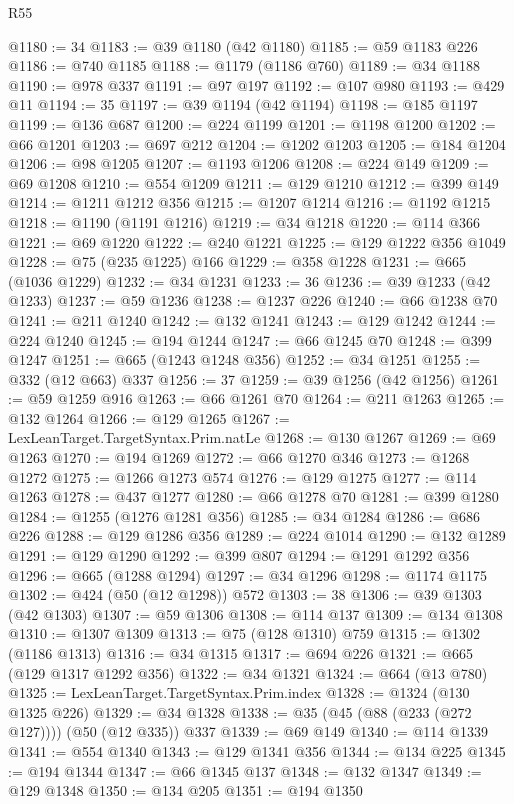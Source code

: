 \begin{lexlean}{R55}
\begin{coremodule}
@1180 := 34
@1183 := @39 @1180 (@42 @1180)
@1185 := @59 @1183 @226
@1186 := @740 @1185
@1188 := @1179 (@1186 @760)
@1189 := @34 @1188
@1190 := @978 @337
@1191 := @97 @197
@1192 := @107 @980
@1193 := @429 @11
@1194 := 35
@1197 := @39 @1194 (@42 @1194)
@1198 := @185 @1197
@1199 := @136 @687
@1200 := @224 @1199
@1201 := @1198 @1200
@1202 := @66 @1201
@1203 := @697 @212
@1204 := @1202 @1203
@1205 := @184 @1204
@1206 := @98 @1205
@1207 := @1193 @1206
@1208 := @224 @149
@1209 := @69 @1208
@1210 := @554 @1209
@1211 := @129 @1210
@1212 := @399 @149
@1214 := @1211 @1212 @356
@1215 := @1207 @1214
@1216 := @1192 @1215
@1218 := @1190 (@1191 @1216)
@1219 := @34 @1218
@1220 := @114 @366
@1221 := @69 @1220
@1222 := @240 @1221
@1225 := @129 @1222 @356 @1049
@1228 := @75 (@235 @1225) @166
@1229 := @358 @1228
@1231 := @665 (@1036 @1229)
@1232 := @34 @1231
@1233 := 36
@1236 := @39 @1233 (@42 @1233)
@1237 := @59 @1236
@1238 := @1237 @226
@1240 := @66 @1238 @70
@1241 := @211 @1240
@1242 := @132 @1241
@1243 := @129 @1242
@1244 := @224 @1240
@1245 := @194 @1244
@1247 := @66 @1245 @70
@1248 := @399 @1247
@1251 := @665 (@1243 @1248 @356)
@1252 := @34 @1251
@1255 := @332 (@12 @663) @337
@1256 := 37
@1259 := @39 @1256 (@42 @1256)
@1261 := @59 @1259 @916
@1263 := @66 @1261 @70
@1264 := @211 @1263
@1265 := @132 @1264
@1266 := @129 @1265
@1267 := LexLeanTarget.TargetSyntax.Prim.natLe
@1268 := @130 @1267
@1269 := @69 @1263
@1270 := @194 @1269
@1272 := @66 @1270 @346
@1273 := @1268 @1272
@1275 := @1266 @1273 @574
@1276 := @129 @1275
@1277 := @114 @1263
@1278 := @437 @1277
@1280 := @66 @1278 @70
@1281 := @399 @1280
@1284 := @1255 (@1276 @1281 @356)
@1285 := @34 @1284
@1286 := @686 @226
@1288 := @129 @1286 @356
@1289 := @224 @1014
@1290 := @132 @1289
@1291 := @129 @1290
@1292 := @399 @807
@1294 := @1291 @1292 @356
@1296 := @665 (@1288 @1294)
@1297 := @34 @1296
@1298 := @1174 @1175
@1302 := @424 (@50 (@12 @1298)) @572
@1303 := 38
@1306 := @39 @1303 (@42 @1303)
@1307 := @59 @1306
@1308 := @114 @137
@1309 := @134 @1308
@1310 := @1307 @1309
@1313 := @75 (@128 @1310) @759
@1315 := @1302 (@1186 @1313)
@1316 := @34 @1315
@1317 := @694 @226
@1321 := @665 (@129 @1317 @1292 @356)
@1322 := @34 @1321
@1324 := @664 (@13 @780)
@1325 := LexLeanTarget.TargetSyntax.Prim.index
@1328 := @1324 (@130 @1325 @226)
@1329 := @34 @1328
@1338 := @35 (@45 (@88 (@233 (@272 @127)))) (@50 (@12 @335)) @337
@1339 := @69 @149
@1340 := @114 @1339
@1341 := @554 @1340
@1343 := @129 @1341 @356
@1344 := @134 @225
@1345 := @194 @1344
@1347 := @66 @1345 @137
@1348 := @132 @1347
@1349 := @129 @1348
@1350 := @134 @205
@1351 := @194 @1350

\end{coremodule}
\end{lexlean}
